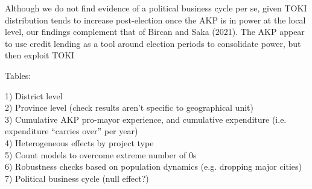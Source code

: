 \documentclass[10pt, oneside]{article}   	%
\numberwithin{equation}{section}
\begin{document}
Although we do not find evidence of a political business cycle per se, given TOKI distribution tends to increase post-election once the AKP is in power at the local level, our findings complement that of Bircan and Saka (2021). The AKP appear to use credit lending as a tool around election periods to consolidate power, but then exploit TOKI 


Tables:

1) District level \\
2) Province level (check results aren't specific to geographical unit) \\
3) Cumulative AKP pro-mayor experience, and cumulative expenditure (i.e. expenditure ``carries over'' per year) \\
4) Heterogeneous effects by project type \\
5) Count models to overcome extreme number of 0s \\
6) Robustness checks based on population dynamics (e.g. dropping major cities) \\
7) Political business cycle (null effect?)
\end{document}
